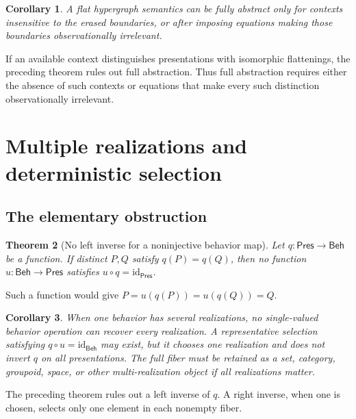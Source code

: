 \documentclass[12pt,a4paper,twoside]{extarticle}
\makeatletter
\theoremstyle{compactplain}
\newtheorem{theorem}{Theorem}[section]
\newtheorem{corollary}[theorem]{Corollary}
\theoremstyle{compactdef}
\renewenvironment{proof}[1][\proofname]{\par\pushQED{\qed}\normalfont
  \topsep2pt\trivlist\item[\hskip\labelsep\bfseries #1\@addpunct{.}]\ignorespaces}
 {\popQED\endtrivlist\@endpefalse}
\newcommand{\Pres}{\mathsf{Pres}}
\newcommand{\Beh}{\mathsf{Beh}}
\makeatother
\begin{document}
\begin{corollary}
A flat hypergraph semantics can be fully abstract only for contexts insensitive to the erased boundaries, or after imposing equations making those boundaries observationally irrelevant.
\end{corollary}
\begin{proof}
If an available context distinguishes presentations with isomorphic flattenings, the preceding theorem rules out full abstraction.  Thus full abstraction requires either the absence of such contexts or equations that make every such distinction observationally irrelevant.
\end{proof}
\section{Multiple realizations and deterministic selection}

\subsection{The elementary obstruction}
\begin{theorem}[No left inverse for a noninjective behavior map]
Let $q:\Pres\to\Beh$ be a function. If distinct $P,Q$ satisfy $q(P)=q(Q)$, then no function $u:\Beh\to\Pres$ satisfies $u\circ q=\mathrm{id}_{\Pres}$.
\end{theorem}
\begin{proof}
Such a function would give $P=u(q(P))=u(q(Q))=Q$.
\end{proof}

\begin{corollary}
When one behavior has several realizations, no single-valued behavior operation can recover every realization. A representative selection satisfying $q\circ u=\mathrm{id}_{\Beh}$ may exist, but it chooses one realization and does not invert $q$ on all presentations. The full fiber must be retained as a set, category, groupoid, space, or other multi-realization object if all realizations matter.
\end{corollary}
\begin{proof}
The preceding theorem rules out a left inverse of $q$.  A right inverse, when one is chosen, selects only one element in each nonempty fiber.
\end{proof}
\end{document}
